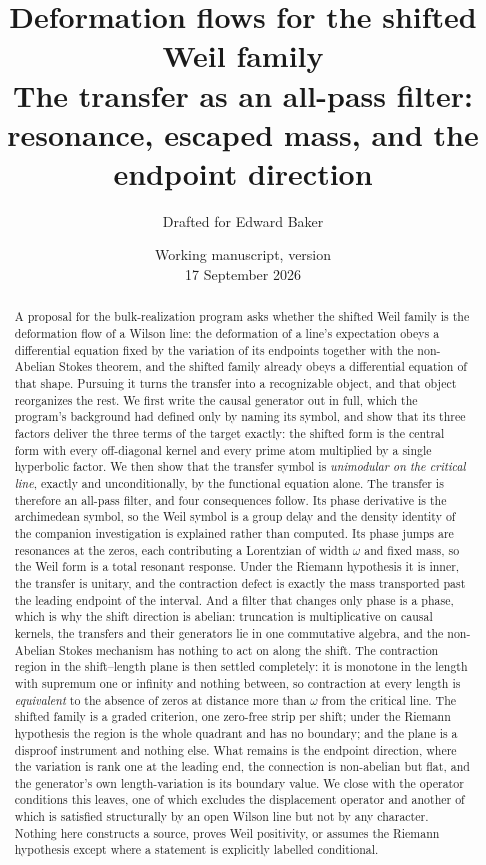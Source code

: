 \documentclass[11pt]{article}
\title{Deformation flows for the shifted Weil family\\[5pt]
\large The transfer as an all-pass filter: resonance, escaped mass,
and the endpoint direction}
\author{Drafted for Edward Baker}
\date{Working manuscript, version \draftversion\\17 September 2026}
\numberwithin{equation}{section}
\theoremstyle{definition}
\theoremstyle{remark}
\begin{document}
\maketitle
\begin{abstract}
A proposal for the bulk-realization program asks whether the shifted Weil family
is the deformation flow of a Wilson line: the deformation of a line's expectation
obeys a differential equation fixed by the variation of its endpoints together
with the non-Abelian Stokes theorem, and the shifted family already obeys a
differential equation of that shape. Pursuing it turns the transfer into a
recognizable object, and that object reorganizes the rest. We first write the
causal generator out in full, which the program's background had defined only by
naming its symbol, and show that its three factors deliver the three terms of the
target exactly: the shifted form is the central form with every off-diagonal
kernel and every prime atom multiplied by a single hyperbolic factor. We then
show that the transfer symbol is \emph{unimodular on the critical line}, exactly
and unconditionally, by the functional equation alone. The transfer is therefore
an all-pass filter, and four consequences follow. Its phase derivative is the
archimedean symbol, so the Weil symbol is a group delay and the density identity
of the companion investigation is explained rather than computed. Its phase jumps
are resonances at the zeros, each contributing a Lorentzian of width $\omega$ and
fixed mass, so the Weil form is a total resonant response. Under the Riemann
hypothesis it is inner, the transfer is unitary, and the contraction defect is
exactly the mass transported past the leading endpoint of the interval. And a
filter that changes only phase is a phase, which is why the shift direction is
abelian: truncation is multiplicative on causal kernels, the transfers and their
generators lie in one commutative algebra, and the non-Abelian Stokes mechanism
has nothing to act on along the shift. The contraction region in the
shift--length plane is then settled completely: it is monotone in the length with
supremum one or infinity and nothing between, so contraction at every length is
\emph{equivalent} to the absence of zeros at distance more than $\omega$ from the
critical line. The shifted family is a graded criterion, one zero-free strip per
shift; under the Riemann hypothesis the region is the whole quadrant and has no
boundary; and the plane is a disproof instrument and nothing else. What remains
is the endpoint direction, where the variation is rank one at the leading end,
the connection is non-abelian but flat, and the generator's own length-variation
is its boundary value. We close with the operator conditions this leaves, one of
which excludes the displacement operator and another of which is satisfied
structurally by an open Wilson line but not by any character. Nothing here
constructs a source, proves Weil positivity, or assumes the Riemann hypothesis
except where a statement is explicitly labelled conditional.
\end{abstract}
\end{document}
